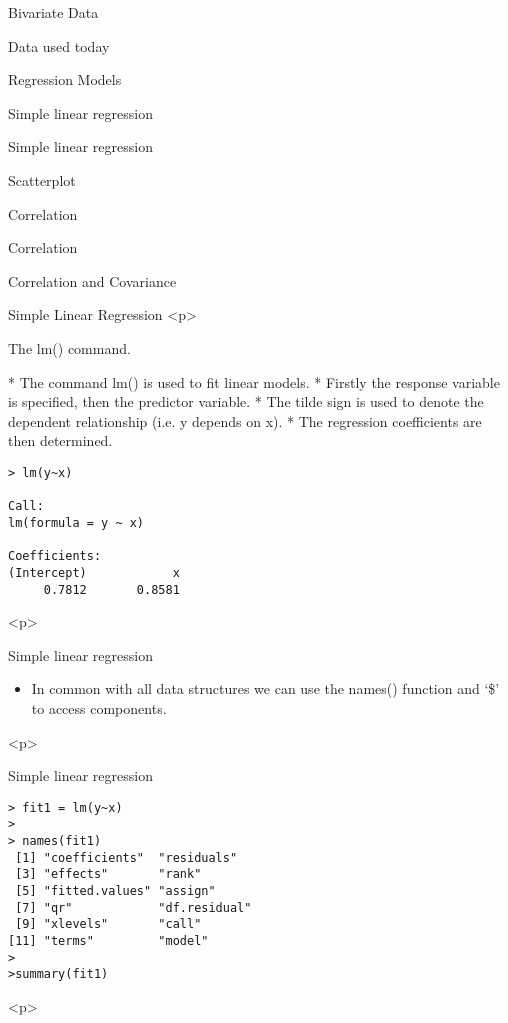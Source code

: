 \begin{slide}{Bivariate Data}
\begin{slide}{Data used today}
\begin{slide}{Regression Models}
\begin{slide}{Simple linear regression}
\begin{slide}{Simple linear regression}
\begin{slide}{Scatterplot}
\begin{slide}{Correlation}
\begin{slide}{Correlation}
\begin{slide}{Correlation and Covariance}
\begin{slide}{Simple Linear Regression}
<p>


\begin{slide}{The lm() command.}
\begin{itemize}
* The command lm() is used to fit linear models. * Firstly the response variable is specified, then the predictor variable. * The tilde sign is used to denote the dependent relationship (i.e. y depends on x).
* The regression coefficients are then determined.
\end{itemize}
\begin{verbatim}
> lm(y~x)

Call:
lm(formula = y ~ x)

Coefficients:
(Intercept)            x
     0.7812       0.8581
\end{verbatim}

<p>

\begin{slide}{Simple linear regression}
\begin{itemize} * A more detailed model (i.e. more than just the coefficients) is generated in the form of a data object. * We can give a name to the model, and view all of the results of the calculation, including \begin {itemize} * The regression coefficients \item
The fitted $\hat{y}$ values (i.e. the estimated `y' values for the x date set) * The residuals (i.e. the differences between  the estimated `y' values and the observed `y' values). \end{itemize}\item
In common with all data structures we can use the names() function and `\$' to access components.\end{itemize}
<p>

\begin{slide}{Simple linear regression}

\begin{verbatim}
> fit1 = lm(y~x)
>
> names(fit1)
 [1] "coefficients"  "residuals"
 [3] "effects"       "rank"
 [5] "fitted.values" "assign"
 [7] "qr"            "df.residual"
 [9] "xlevels"       "call"
[11] "terms"         "model"
>
>summary(fit1)
\end{verbatim}

<p>



\end{slide}
\end{slide}
\end{slide}
\end{slide}
\end{slide}
\end{slide}
\end{slide}
\end{slide}
\end{slide}
\end{slide}
\end{slide}
\end{slide}
\end{slide}
